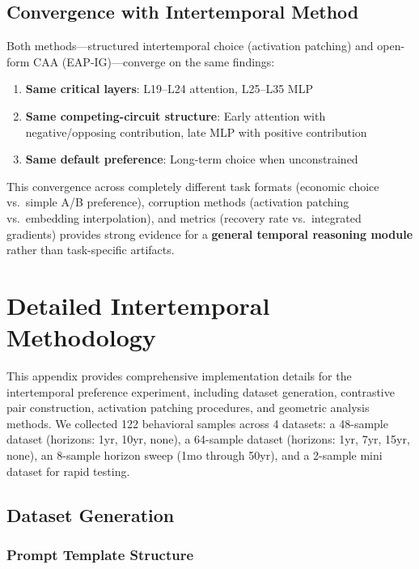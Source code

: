 \documentclass{article}
\begin{document}
\subsection{Convergence with Intertemporal Method}

Both methods---structured intertemporal choice (activation patching) and open-form CAA (EAP-IG)---converge on the same findings:

\begin{enumerate}
    \item \textbf{Same critical layers}: L19--L24 attention, L25--L35 MLP
    \item \textbf{Same competing-circuit structure}: Early attention with negative/opposing contribution, late MLP with positive contribution
    \item \textbf{Same default preference}: Long-term choice when unconstrained
\end{enumerate}

This convergence across completely different task formats (economic choice vs.\ simple A/B preference), corruption methods (activation patching vs.\ embedding interpolation), and metrics (recovery rate vs.\ integrated gradients) provides strong evidence for a \textbf{general temporal reasoning module} rather than task-specific artifacts.


\section{Detailed Intertemporal Methodology}

This appendix provides comprehensive implementation details for the intertemporal preference experiment, including dataset generation, contrastive pair construction, activation patching procedures, and geometric analysis methods. We collected 122 behavioral samples across 4 datasets: a 48-sample dataset (horizons: 1yr, 10yr, none), a 64-sample dataset (horizons: 1yr, 7yr, 15yr, none), an 8-sample horizon sweep (1mo through 50yr), and a 2-sample mini dataset for rapid testing.

\subsection{Dataset Generation}

\subsubsection{Prompt Template Structure}
\end{document}
